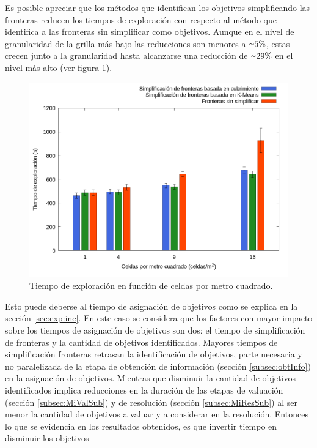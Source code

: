 Es posible apreciar que los métodos que identifican los objetivos simplificando
las fronteras reducen los tiempos de exploración con respecto al método que
identifica a las fronteras sin simplificar como objetivos. Aunque en el nivel
de granularidad de la grilla más bajo las reducciones son menores a ${\smallsim}5\%$, estas crecen junto
a la granularidad hasta alcanzarse una reducción de ${\smallsim}29\%$ en el
nivel más alto (ver figura \ref{fig:gra:idobj:et}).
\begin{figure}[!h]
  \centerfloat
  \includegraphics[clip=true, width=\graphlen]{imagenes/graficas_chicas/graficas_histo_num/ident_obj/exploration_time.png}
  \caption{Tiempo de exploración en función de celdas por metro cuadrado.}\label{fig:gra:idobj:et}
\end{figure}
Esto puede deberse al tiempo de asignación de objetivos como se
explica en la sección \ref{sec:exp:inc}. En este caso se considera que los
factores con mayor impacto sobre los tiempos de asignación de objetivos son dos:
el tiempo de simplificación de fronteras y la cantidad de objetivos
identificados. Mayores tiempos de simplificación fronteras retrasan la
identificación de objetivos, parte necesaria y no paralelizada de la etapa de
obtención de información (sección \ref{subsec:obtInfo}) en la asignación de
objetivos. Mientras que disminuir la cantidad de objetivos identificados implica
reducciones en la duración de las etapas de valuación (sección
\ref{subsec:MiValSub}) y de resolución (sección \ref{subsec:MiResSub}) al ser
menor la cantidad de objetivos a valuar y a considerar en la resolución. Entonces lo que se evidencia
en los resultados obtenidos, es que invertir tiempo en disminuir los objetivos
